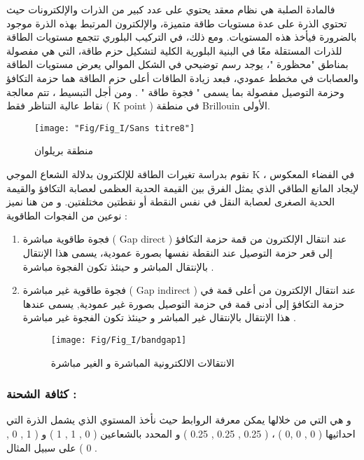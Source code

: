 		فالمادة الصلبة هي نظام معقد يحتوي على عدد كبير من الذرات والإلكترونات حيث تحتوي الذرة على عدة مستويات طاقة متميزة، والإلكترون المرتبط بهذه الذرة موجود بالضرورة فيأخذ هذه المستويات. ومع ذلك، في التركيب البلوري تتجمع مستويات الطاقة للذرات المستقلة معًا في البنية البلورية الكلية لتشكيل حزم طاقة، التي هي مفصولة بمناطق "محظورة "، يوجد رسم توضيحي في الشكل الموالي يعرض مستويات الطاقة والعصابات في مخطط عمودي، فبعد زيادة الطاقات أعلى حزم الطاقة هما حزمة التكافؤ وحزمة التوصيل مفصولة بما يسمى " فجوة طاقة " . ومن أجل التبسيط ، تتم معالجة نقاط عالية التناظر  فقط ( K point ) في منطقة Brillouin الأولى.\\ \cite{a3}
		
		\begin{figure}[h]
			\centering
			\texttt{[image: "Fig/Fig\_I/Sans titre8"]}
			\caption{منطقة بريلوان}
			\label{fig:sans-titre8}
		\end{figure}
		\FloatBarrier
		
		نقوم بدراسة تغيرات الطاقة للإلكترون بدلالة الشعاع الموجي K في الفضاء المعكوس ، لإيجاد المانع الطاقي الذي يمثل الفرق بين القيمة الحدية العظمى لعصابة التكافؤ والقيمة الحدية الصغرى لعصابة النقل في نفس النقطة أو نقطتين مختلفتين. و من هنا نميز نوعين من الفجوات الطاقوية :
		
		\begin{enumerate}
			
			\item 
			فجوة طاقوية مباشرة ( Gap direct ) عند انتقال الإلكترون من قمة حزمة التكافؤ إلى قعر حزمة التوصيل عند النقطة نفسها بصورة عمودية، يسمى هذا الإنتقال بالإنتقال المباشر و حينئذ تكون الفجوة مباشرة .
			
			\item 
			فجوة طاقوية غير مباشرة ( Gap indirect ) عند انتقال الإلكترون من أعلى قمة في حزمة التكافؤ إلى أدنى قمة في حزمة التوصيل بصورة غير عمودية, يسمى عندها هذا الإنتقال بالإنتقال غير المباشر و حينئذ تكون الفجوة غير مباشرة .
			
			\begin{figure}[h]
				\centering
				\texttt{[image: Fig/Fig\_I/bandgap1]}
				\caption{الانتقالات الالكترونية المباشرة و الغير مباشرة}
				\label{fig:bandgap1}
			\end{figure}
		\FloatBarrier
			
		\end{enumerate}
		
					\subsubsection*{كثافة الشحنة :}
		 و هي التي من خلالها يمكن معرفة الروابط حيث نأخذ المستوي الذي يشمل الذرة التي احداثيها ( 0 , 0 ,0 ) ، ( 0.25 , 0.25 , 0.25 ) و المحدد بالشعاعين ( 0 , 1 , 1 ) و ( 1 , 0 , 0 )  على سبيل المثال .
		
